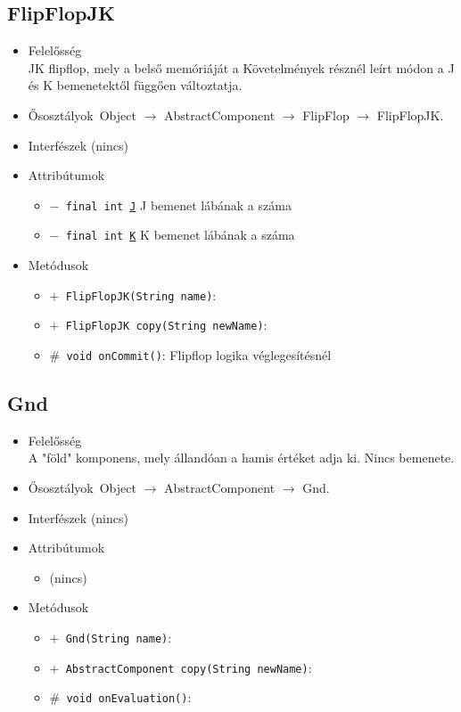 \subsection{FlipFlopJK}
\begin{itemize}
\item Felelősség\\
JK flipflop, mely a belső memóriáját a Követelmények résznél leírt módon  a J és K bemenetektől függően változtatja.
\item Ősosztályok\ Object $\rightarrow{}$ AbstractComponent $\rightarrow{}$ FlipFlop $\rightarrow{}$ FlipFlopJK.
\item Interfészek (nincs)
\item Attribútumok $\ $
\begin{itemize}
	\item[] \texttt{$-$ final int \underline{J}} J bemenet lábának a száma
	\item[] \texttt{$-$ final int \underline{K}} K bemenet lábának a száma
\end{itemize}
\item Metódusok$\ $
\begin{itemize}
	\item[] \texttt{$+$ FlipFlopJK(String name)}: 
	\item[] \texttt{$+$ FlipFlopJK copy(String newName)}: 
	\item[] \texttt{$\#$ void onCommit()}: Flipflop logika véglegesítésnél
\end{itemize}
\end{itemize}

\subsection{Gnd}
\begin{itemize}
\item Felelősség\\
A "föld" komponens, mely állandóan a hamis értéket adja ki. Nincs bemenete.
\item Ősosztályok\ Object $\rightarrow{}$ AbstractComponent $\rightarrow{}$ Gnd.
\item Interfészek (nincs)
\item Attribútumok $\ $
\begin{itemize}
\item (nincs)
\end{itemize}
\item Metódusok$\ $
\begin{itemize}
	\item[] \texttt{$+$ Gnd(String name)}: 
	\item[] \texttt{$+$ AbstractComponent copy(String newName)}: 
	\item[] \texttt{$\#$ void onEvaluation()}: 
\end{itemize}
\end{itemize}

